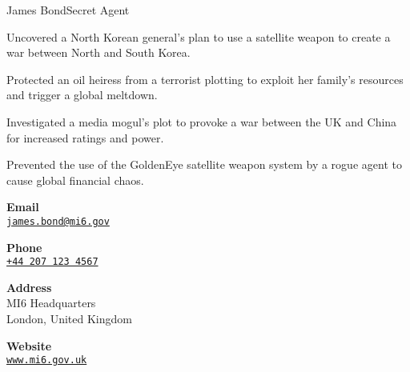 \documentclass{article}
\begin{document}
\begin{cv}[avatar]{James Bond}{Secret Agent}
\begin{cvevent}[2002]
    Uncovered a North Korean general's plan to use a satellite weapon to create a war between North and South Korea.
\end{cvevent}

\begin{cvevent}[1999]
    Protected an oil heiress from a terrorist plotting to exploit her family's resources and trigger a global meltdown.
\end{cvevent}

\begin{cvevent}[1997]
    Investigated a media mogul's plot to provoke a war between the UK and China for increased ratings and power.
\end{cvevent}

\begin{cvevent}[1995]
    Prevented the use of the GoldenEye satellite weapon system by a rogue agent to cause global financial chaos.
\end{cvevent}


\cvsidebar %


\begin{cvitem}[Envelope][0.6]
    \textbf{Email}\\
    \href{mailto:james.bond@mi6.gov}{\texttt{james.bond@mi6.gov}}
\end{cvitem}

\cvseparator[3]
\begin{cvitem}[Phone][0.6]
    \textbf{Phone}\\
    \href{tel:+442071234567}{\texttt{+44 207 123 4567}}
\end{cvitem}

\cvseparator[3]
\begin{cvitem}[Home][0.6]
    \textbf{Address}\\
    MI6 Headquarters\\ London, United Kingdom
\end{cvitem}

\cvseparator[3]
\begin{cvitem}[Globe][0.6]
    \textbf{Website}\\
    \href{https://www.mi6.gov.uk}{\texttt{www.mi6.gov.uk}}
\end{cvitem}



\end{cv}
\end{document}
